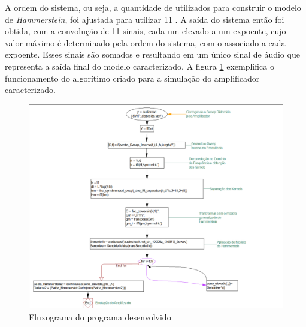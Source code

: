 \pagebreak
A ordem do sistema, ou seja, a quantidade de  utilizados para construir o modelo de \textit{Hammerstein}, foi ajustada para utilizar 11 . A saída do sistema então foi obtida, com a convolução de 11 sinais, cada um elevado a um expoente, cujo valor máximo é determinado pela ordem do sistema, com o  associado a cada expoente. Esses sinais são somados e resultando em um único sinal de áudio que representa a saída final do modelo caracterizado. A figura \ref{fig:diagramamatlab} exemplifica o funcionamento do algorítimo criado para a simulação do amplificador caracterizado.


\begin{figure}[!htb]

	\includegraphics[width=1.0\linewidth]{figuras/Diagrama_Matlab}
	\caption{Fluxograma do programa desenvolvido}
	\label{fig:diagramamatlab}
\end{figure}
